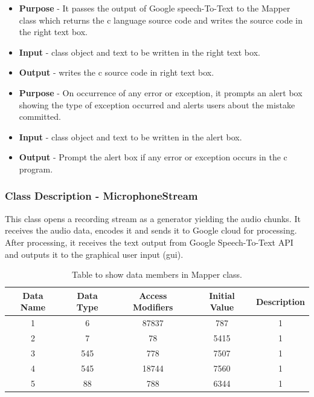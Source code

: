 \documentclass[12pt]{article}
\renewcommand{\thetable}{\arabic{section}(\alph{table})}
\renewcommand{\thetable}{\arabic{section}.\arabic{subsection}(\alph{table})}
\renewcommand{\thetable}{\arabic{section}.\arabic{subsection}.\arabic{subsubsection}(\alph{table})}
\newcounter{subsubsubsection}[subsubsection]
\begin{document}
\begin{itemize}
    \setlength{\itemsep}{1pt}
    \item \textbf{Purpose} - It passes the output of Google speech-To-Text to the Mapper class which returns the c language source code and writes the source code in the right text box.
    \item \textbf{Input} - class object and text to be written in the right text box.
    \item \textbf{Output} - writes the c source code in right text box.
\end{itemize}

\begin{itemize}
    \setlength{\itemsep}{1pt}
    \item \textbf{Purpose} - On occurrence of any error or exception, it prompts an alert box showing the type of exception occurred and alerts users about the mistake committed.
    \item \textbf{Input} - class object and text to be written in the alert box.
    \item \textbf{Output} - Prompt the alert box if any error or exception occurs in the c program.
\end{itemize}


\subsubsection{Class Description - MicrophoneStream}

This class opens a recording stream as a generator yielding the audio chunks. It receives the audio data, encodes it and sends it to Google cloud for processing. After processing, it receives the text output from Google Speech-To-Text API and outputs it to the graphical user input (gui).

\renewcommand{\thetable}{\arabic{section}.\arabic{subsection}.\arabic{subsubsection}}
\begin{table}[H]
\centering
\begin{tabular}{|c c c c c|} 
 \hline
 Data Name & Data Type & Access Modifiers & Initial Value & Description \\ [0.5ex] 
 \hline\hline
 1 & 6 & 87837 & 787 & 1 \\ 
 2 & 7 & 78 & 5415 & 1 \\
 3 & 545 & 778 & 7507 & 1\\
 4 & 545 & 18744 & 7560 & 1\\
 5 & 88 & 788 & 6344 & 1\\ [1ex] 
 \hline
\end{tabular}
\caption{Table to show data members in Mapper class.}
\label{Data members in MicrophoneStream class}
\end{table}
\end{document}
